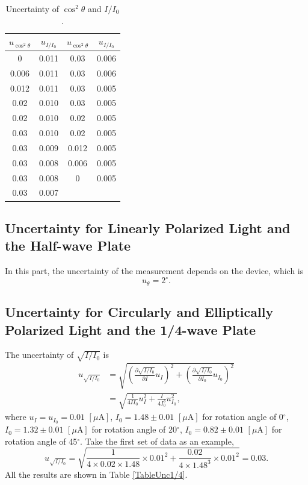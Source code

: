 \documentclass[a4paper]{article}
\begin{document}
\begin{table}[H]
	\centering
	\begin{tabular}{cc||cc}
		\hline
		$u_{\cos^2\theta}$ & $u_{I/I_0}$ & $u_{\cos^2\theta}$ & $u_{I/I_0}$ \\
		\hline
		0                  & 0.011       & 0.03               & 0.006       \\
		0.006              & 0.011       & 0.03               & 0.006       \\
		0.012              & 0.011       & 0.03               & 0.005       \\
		0.02               & 0.010       & 0.03               & 0.005       \\
		0.02               & 0.010       & 0.02               & 0.005       \\
		0.03               & 0.010       & 0.02               & 0.005       \\
		0.03               & 0.009       & 0.012              & 0.005       \\
		0.03               & 0.008       & 0.006              & 0.005       \\
		0.03               & 0.008       & 0                  & 0.005       \\
		0.03               & 0.007       &                    &             \\
		\hline
	\end{tabular}
	\caption{Uncertainty of $\cos^2\theta$ and $I/I_0$.}
	\label{table::uncosine}
\end{table}

\subsection{Uncertainty for Linearly Polarized Light and the Half-wave Plate}

In this part, the uncertainty of the measurement depends on the device, which is
$$u_\theta = 2^\circ.$$

\subsection{Uncertainty for Circularly and Elliptically Polarized Light and the 1/4-wave Plate}

The uncertainty of $\sqrt{I/I_0}$ is
\begin{align*}
	u_{\sqrt{I/I_{0}}} & =\sqrt{(\frac{\partial\sqrt{I/I_0}}{\partial I}u_{I})^{2}+(\frac{\partial\sqrt{I/I_0}}{\partial I_{0}}u_{I_{0}})^{2}} \\
	                   & =\sqrt{\frac{1}{4II_0}u_I^2+\frac{I}{4I_0^3}u_{I_0}^2},
\end{align*}
where $u_I = u_{I_0} = 0.01\,\,[\mu\text{A}]$, $I_0 = 1.48 \pm 0.01\,\,[\mu\text{A}]$ for rotation angle of 0$^\circ$, $I_0 = 1.32 \pm 0.01\,\,[\mu\text{A}]$ for rotation angle of 20$^\circ$, $I_0 = 0.82 \pm 0.01\,\,[\mu\text{A}]$ for rotation angle of 45$^\circ$. Take the first set of data as an example,
$$u_{\sqrt{I/I_{0}}}=\sqrt{\frac{1}{4\times 0.02 \times 1.48} \times 0.01^2+\frac{0.02}{4\times 1.48^3}\times 0.01^2}=0.03.$$
All the results are shown in Table \ref{TableUnc1/4}.
\end{document}
